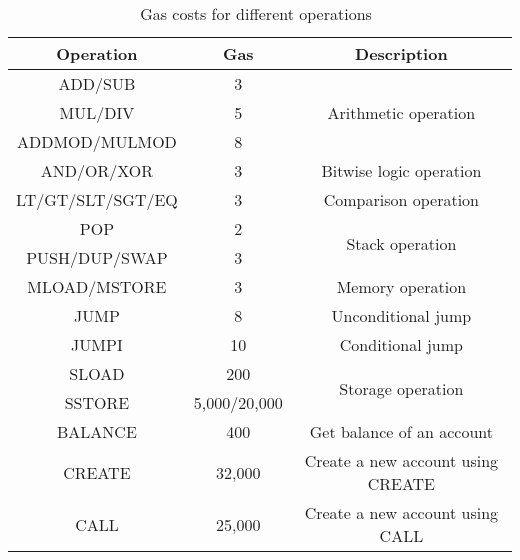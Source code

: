 \begin{table}[H]
	\centering
	\vspace*{-1ex}
	\scriptsize
	\caption{Gas costs for different operations~\cite{DBLP:journals/corr/ChenLLZ17}}
	\vspace{-1ex}
	\label{table:opcode_table}
	\begin{tabular}{|c|c|c|}
		\hline
		\textbf{Operation}        & \textbf{Gas} & \textbf{Description} \\ \hline
		\textsc{ADD/SUB}          & 3 & \multirow{3}{*}{Arithmetic operation} \\ \cline{1-2}
		\textsc{MUL/DIV}          & 5 & \\ \cline{1-2}
		\textsc{ADDMOD/MULMOD}    & 8 & \\ \hline
		\textsc{AND/OR/XOR}       & 3 & Bitwise logic operation \\ \hline
		\textsc{LT/GT/SLT/SGT/EQ} & 3 & Comparison operation \\ \hline
		\textsc{POP}              & 2 & \multirow{2}{*}{Stack operation} \\ \cline{1-2}
		\textsc{PUSH/DUP/SWAP}    & 3 & \\ \hline
		\textsc{MLOAD/MSTORE}     & 3 & Memory operation \\ \hline
		\textsc{JUMP}             & 8 & Unconditional jump \\ \hline
		\textsc{JUMPI}            & 10 & Conditional jump \\ \hline
		\textsc{SLOAD}            & 200 & \multirow{2}{*}{Storage operation} \\ \cline{1-2}
		\textsc{SSTORE}           & 5,000/20,000 & \\ \hline
		\textsc{BALANCE}          & 400 & Get balance of an account \\ \hline
		\textsc{CREATE}           & 32,000 & Create a new account using CREATE \\ \hline
		\textsc{CALL}             & 25,000 & Create a new account using CALL \\  \hline
	\end{tabular}
	\vspace{-2ex}
\end{table}